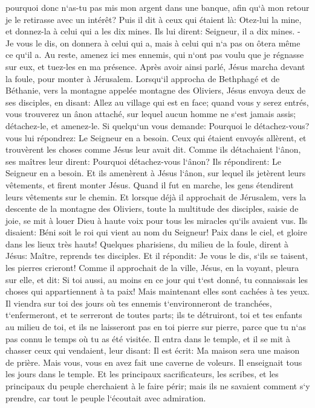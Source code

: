 \verse pourquoi donc n`as-tu pas mis mon argent dans une banque, afin qu`à mon retour je le retirasse avec un intérêt? 
\verse Puis il dit à ceux qui étaient là: Otez-lui la mine, et donnez-la à celui qui a les dix mines. 
\verse Ils lui dirent: Seigneur, il a dix mines. - 
\verse Je vous le dis, on donnera à celui qui a, mais à celui qui n`a pas on ôtera même ce qu`il a. 
\verse Au reste, amenez ici mes ennemis, qui n`ont pas voulu que je régnasse sur eux, et tuez-les en ma présence. 
\verse Après avoir ainsi parlé, Jésus marcha devant la foule, pour monter à Jérusalem. 
\verse Lorsqu`il approcha de Bethphagé et de Béthanie, vers la montagne appelée montagne des Oliviers, Jésus envoya deux de ses disciples, 
\verse en disant: Allez au village qui est en face; quand vous y serez entrés, vous trouverez un ânon attaché, sur lequel aucun homme ne s`est jamais assis; détachez-le, et amenez-le. 
\verse Si quelqu`un vous demande: Pourquoi le détachez-vous? vous lui répondrez: Le Seigneur en a besoin. 
\verse Ceux qui étaient envoyés allèrent, et trouvèrent les choses comme Jésus leur avait dit. 
\verse Comme ils détachaient l`ânon, ses maîtres leur dirent: Pourquoi détachez-vous l`ânon? 
\verse Ils répondirent: Le Seigneur en a besoin. 
\verse Et ils amenèrent à Jésus l`ânon, sur lequel ils jetèrent leurs vêtements, et firent monter Jésus. 
\verse Quand il fut en marche, les gens étendirent leurs vêtements sur le chemin. 
\verse Et lorsque déjà il approchait de Jérusalem, vers la descente de la montagne des Oliviers, toute la multitude des disciples, saisie de joie, se mit à louer Dieu à haute voix pour tous les miracles qu`ils avaient vus. 
\verse Ils disaient: Béni soit le roi qui vient au nom du Seigneur! Paix dans le ciel, et gloire dans les lieux très hauts! 
\verse Quelques pharisiens, du milieu de la foule, dirent à Jésus: Maître, reprends tes disciples. 
\verse Et il répondit: Je vous le dis, s`ils se taisent, les pierres crieront! 
\verse Comme il approchait de la ville, Jésus, en la voyant, pleura sur elle, et dit: 
\verse Si toi aussi, au moins en ce jour qui t`est donné, tu connaissais les choses qui appartiennent à ta paix! Mais maintenant elles sont cachées à tes yeux. 
\verse Il viendra sur toi des jours où tes ennemis t`environneront de tranchées, t`enfermeront, et te serreront de toutes parts; 
\verse ils te détruiront, toi et tes enfants au milieu de toi, et ils ne laisseront pas en toi pierre sur pierre, parce que tu n`as pas connu le temps où tu as été visitée. 
\verse Il entra dans le temple, et il se mit à chasser ceux qui vendaient, 
\verse leur disant: Il est écrit: Ma maison sera une maison de prière. Mais vous, vous en avez fait une caverne de voleurs. 
\verse Il enseignait tous les jours dans le temple. Et les principaux sacrificateurs, les scribes, et les principaux du peuple cherchaient à le faire périr; 
\verse mais ils ne savaient comment s`y prendre, car tout le peuple l`écoutait avec admiration. 

